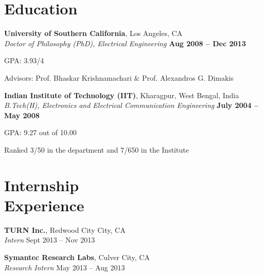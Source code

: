 \documentclass[margin,line]{resume}
\begin{document}
\begin{resume}
    \section{\mysidestyle Education}

    \textbf{University of Southern California}, Los Angeles, CA \\%
    \textsl{Doctor of Philosophy (PhD), Electrical Engineering} \hfill \textbf{ Aug 2008 -- Dec 2013}\vspace{-3mm}\\\vspace{-1mm}
    \begin{list2}
        \item GPA: 3.93/4
        \item Advisors:  Prof. Bhaskar Krishnamachari \& Prof. Alexandros G. Dimakis
    \end{list2}\vspace{-1.5mm}
    
    \textbf{Indian Institute of Technology (IIT)}, Kharagpur, West Bengal, India \\%
    \textsl{B.Tech(H), Electronics and Electrical Communication Engineering} \hfill \textbf{ July 2004 -- May 2008}\vspace{-3mm}\\\vspace{-1mm}%
    \begin{list2}
    		\item GPA:	9.27 out of 10.00
    		\item Ranked 3/50 in the department and 7/650 in the Institute        
    \end{list2}\vspace{-1.5mm}%

\section{\mysidestyle Internship\\Experience}

	\textbf{TURN Inc.}, Redwood City City, CA\\
    \textsl{Intern} \hfill Sept 2013 -- Nov 2013
    
    \textbf{Symantec Research Labs}, Culver City, CA\\
    \textsl{Research Intern} \hfill May 2013 -- Aug 2013
	

\end{resume}
\end{document}
